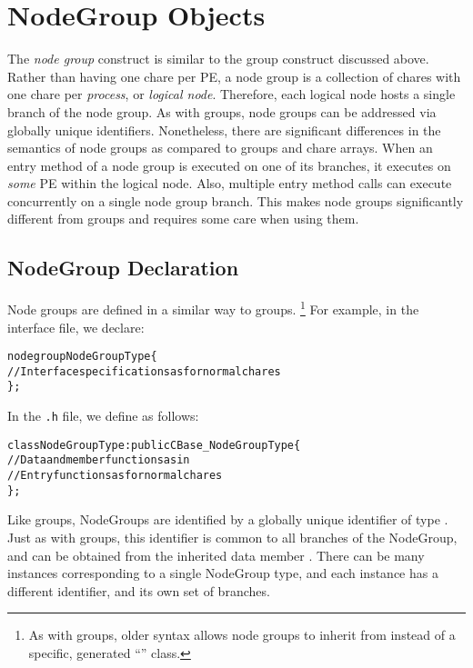 \section{NodeGroup Objects}

The {\em node group} construct  
 is similar to the group construct discussed
above. Rather than having one chare per PE, a node group is a
collection of chares with one chare per {\em process}, or {\em logical
  node}.  Therefore, each logical node hosts a single branch of the
node group.  As with groups, node groups can be addressed via globally
unique identifiers. Nonetheless, there are significant differences in 
the semantics of node groups as compared to groups and chare arrays. 
When an entry method of a node group is executed
on one of its branches, it executes on {\em some} PE within the
logical node. Also, multiple entry method calls can execute
concurrently on a single node group branch. This makes node groups
significantly different from groups and requires some care when using
them.

\subsection{NodeGroup Declaration} 

Node groups are defined in a similar way to groups.  \footnote{As with groups,
older syntax allows node groups to inherit from  instead of a
specific, generated ``'' class.} For example, in the interface file, we declare:

\begin{alltt}
 nodegroup NodeGroupType \{
  // Interface specifications as for normal chares
 \};
\end{alltt}

In the {\tt .h} file, we define  as follows:

\begin{alltt}
 class NodeGroupType : public CBase_NodeGroupType \{
  // Data and member functions as in \CC{}
  // Entry functions as for normal chares
 \};
\end{alltt}

Like groups, NodeGroups are identified by a globally unique identifier of type
.  Just as with groups, this identifier is
common to all branches of the NodeGroup, and can be obtained from the inherited
data member .
There can be many instances corresponding to a single NodeGroup
type, and each instance has a different identifier, and its own set of
branches.



